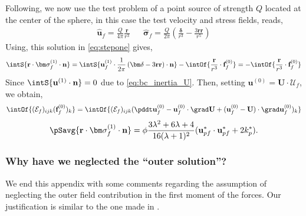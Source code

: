 Following, \citet{stone2001inertial} we now use the test problem of a point source of strength $Q$ located at the center of the sphere, in this case the test velocity  and stress fields, reads, 
\begin{align*}
    \hat{\textbf{u}}_f = \frac{Q}{4\pi} \frac{\textbf{r}}{r^3}
    && \hat{\bm\sigma}_f =  \frac{Q}{2\pi}\left(
        \frac{\bm\delta}{r^3}
        - \frac{3 \textbf{rr}}{r^5}
    \right)
\end{align*}
Using, this solution in \ref{eq:stepone} gives, 
\begin{align*}
    \intS{ \textbf{r}\cdot  \bm\sigma_f^{(1)} \cdot \textbf{n}}
    = 
    \intS{\textbf{u}_f^{(1)} \cdot   \frac{1}{2\pi}\left(
        \bm\delta
        - 3 \textbf{rr}
    \right) \cdot \textbf{n}}
    - \intOf{ \frac{\textbf{r}}{r^3}\cdot  \textbf{f}^{(0)}_f}
    = 
    - \intOf{ \frac{\textbf{r}}{r^3}\cdot  \textbf{f}^{(0)}_f}
\end{align*}
Since $\intS{\textbf{u}^{(1)} \cdot \textbf{n}} =0$ due to \ref{eq:bc_inertia_U}.  
Then, setting $\textbf{u}^{(0)} = \textbf{U}\cdot \mathcal{U}_f$, we obtain, 
\begin{equation}
    \intOf{(\mathcal{E}_f )_{ijk}  (\textbf{f}^{(0)}_f)_k}
    =
    \intOf{(\mathcal{E}_f )_{ijk}  
    (\pddt \textbf{u}_f^{(0)}
    - \textbf{u}_f^{(0)} \cdot \grad \textbf{U}
    + (\textbf{u}_f^{(0)} - \textbf{U})\cdot \grad \textbf{u}_f^{(0)}
    )_k}
\end{equation}
\begin{equation}
    \pSavg{ \textbf{r}\cdot  \bm\sigma_f^{(1)} \cdot \textbf{n}}
    = \phi \frac{3\lambda^2 + 6\lambda + 4}{16(\lambda +1 )^2} (\textbf{u}_{pf}^* \cdot \textbf{u}_{pf}^*
    + 2 k_p^*).
    \label{eq:sol2} 
\end{equation}

\subsubsection{Why have we neglected the ``outer solution''?}

We end this appendix with some comments regarding the assumption of neglecting the outer field contribution in the first moment of the forces.
Our justification is similar to the one made in \citet{stone2001inertial,raja2010inertial,jiang2021inertial}.  

